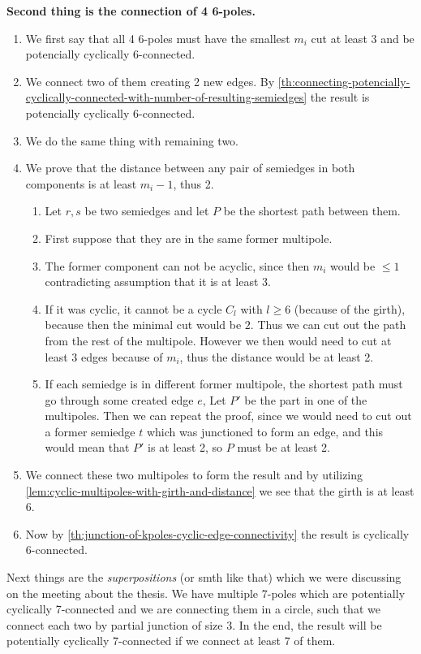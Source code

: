\documentclass[12pt, twoside]{book}
\begin{document}
\textbf{Second thing is the connection of 4 6-poles.}

\begin{enumerate}
	\item We first say that all 4 6-poles must have the smallest $m_i$ cut at least 3 and be potencially cyclically $6$-connected.
	\item We connect two of them creating 2 new edges. By \cref{th:connecting-potencially-cyclically-connected-with-number-of-resulting-semiedges} the result is potencially cyclically $6$-connected.
	\item We do the same thing with remaining two.
	\item We prove that the distance between any pair of semiedges in both components is at least $m_i-1$, thus 2.
	\begin{enumerate}
		\item Let $r,s$ be two semiedges and let $P$ be the shortest path between them.
		\item First suppose that they are in the same former multipole.
		\item The former component can not be acyclic, since then $m_i$ would be $\leq 1$ contradicting assumption that it is at least 3.
		\item If it was cyclic, it cannot be a cycle $C_l$ with $l\geq 6$ (because of the girth), because then the minimal cut would be $2$. Thus we can cut out the path from the rest of the multipole. However we then would need to cut at least $3$ edges because of $m_i$, thus the distance would be at least 2.
		\item If each semiedge is in different former multipole, the shortest path must go through some created edge $e$, Let $P'$ be the part in one of the multipoles. Then we can repeat the proof, since we would need to cut out a former semiedge $t$ which was junctioned to form an edge, and this would mean that $P'$ is at least 2, so $P$ must be at least 2.
	\end{enumerate}
	\item We connect these two multipoles to form the result and by utilizing \cref{lem:cyclic-multipoles-with-girth-and-distance} we see that the girth is at least $6$.
	\item Now by \cref{th:junction-of-kpoles-cyclic-edge-connectivity} the result is cyclically 6-connected.
\end{enumerate}


Next things are the \textit{superpositions} (or smth like that) which we were discussing on the meeting about the thesis. We have multiple 7-poles which are potentially cyclically 7-connected and we are connecting them in a circle, such that we connect each two by partial junction of size 3. In the end, the result will be potentially cyclically 7-connected if we connect at least 7 of them.
\end{document}
